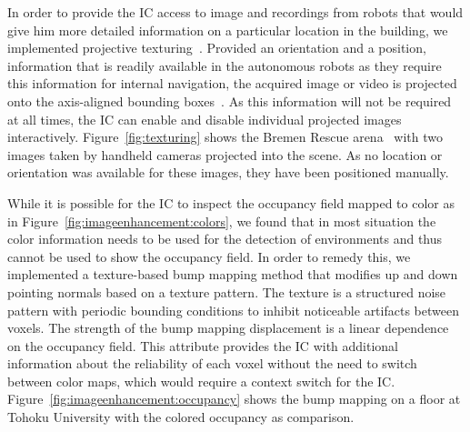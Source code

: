 \documentclass{egpubl}
\begin{document}
 In order to provide the IC access to image and recordings from robots that would give him more detailed information on a particular location in the building, we implemented projective texturing~\cite{everitt2001projective}. Provided an orientation and a position, information that is readily available in the autonomous robots as they require this information for internal navigation, the acquired image or video is projected onto the axis-aligned bounding boxes~\cite{1453517}. As this information will not be required at all times, the IC can enable and disable individual projected images interactively. Figure~\ref{fig:texturing} shows the Bremen Rescue arena~\cite{varsadan08} with two images taken by handheld cameras projected into the scene. As no location or orientation was available for these images, they have been positioned manually.


  While it is possible for the IC to inspect the occupancy field mapped to color as in Figure~\ref{fig:imageenhancement:colors}, we found that in most situation the color information needs to be used for the detection of environments and thus cannot be used to show the occupancy field. In order to remedy this, we implemented a texture-based bump mapping method that modifies up and down pointing normals based on a texture pattern. The texture is a structured noise pattern with periodic bounding conditions to inhibit noticeable artifacts between voxels. The strength of the bump mapping displacement is a linear dependence on the occupancy field. This attribute provides the IC with additional information about the reliability of each voxel without the need to switch between color maps, which would require a context switch for the IC. Figure~\ref{fig:imageenhancement:occupancy} shows the bump mapping on a floor at Tohoku University with the colored occupancy as comparison.

\end{document}
